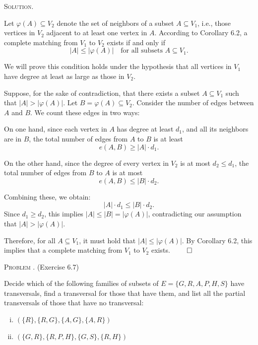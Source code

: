 \documentclass[12pt, a4paper, oneside]{ctexart}
\newcounter{problemname}
\newenvironment{problem}{\begin{framed}\stepcounter{problemname}\par\noindent\textsc{Problem \arabic{problemname}. }}{\end{framed}\par}
\newenvironment{solution}{%
	\par\noindent\textsc{Solution. }\ignorespaces
}{%
	\hfill$\qed$\par
}
\begin{document}
	\begin{solution}
		Let \( \varphi(A) \subseteq V_2 \) denote the set of neighbors of a subset \( A \subseteq V_1 \), i.e., those vertices in \( V_2 \) adjacent to at least one vertex in \( A \). According to Corollary 6.2, a complete matching from \( V_1 \) to \( V_2 \) exists if and only if
		\[
		|A| \leq |\varphi(A)|
		\quad \text{for all subsets } A \subseteq V_1.
		\]
		
		We will prove this condition holds under the hypothesis that all vertices in \( V_1 \) have degree at least as large as those in \( V_2 \).
		
		Suppose, for the sake of contradiction, that there exists a subset \( A \subseteq V_1 \) such that \( |A| > |\varphi(A)| \). Let \( B = \varphi(A) \subseteq V_2 \). Consider the number of edges between \( A \) and \( B \). We count these edges in two ways:
		
		On one hand, since each vertex in \( A \) has degree at least \( d_1 \), and all its neighbors are in \( B \), the total number of edges from \( A \) to \( B \) is at least
		\[
		e(A, B) \geq |A| \cdot d_1.
		\]
		
		On the other hand, since the degree of every vertex in \( V_2 \) is at most \( d_2 \leq d_1 \), the total number of edges from \( B \) to \( A \) is at most
		\[
		e(A, B) \leq |B| \cdot d_2.
		\]
		
		Combining these, we obtain:
		\[
		|A| \cdot d_1 \leq |B| \cdot d_2.
		\]
		Since \( d_1 \geq d_2 \), this implies \( |A| \leq |B| = |\varphi(A)| \), contradicting our assumption that \( |A| > |\varphi(A)| \).
		
		Therefore, for all \( A \subseteq V_1 \), it must hold that \( |A| \leq |\varphi(A)| \). By Corollary 6.2, this implies that a complete matching from \( V_1 \) to \( V_2 \) exists.
	\end{solution}
	
	\begin{problem}
		(Exercise 6.7)
	
	Decide which of the following families of subsets of \( E = \{G, R, A, P, H, S\} \) have transversals, 
	find a transversal for those that have them, and list all the partial transversals 
	of those that have no transversal:
	\begin{enumerate}[(i)]
		\item \( (\{R\}, \{R,G\}, \{A,G\}, \{A,R\}) \)
		\item \( (\{G,R\}, \{R,P,H\}, \{G,S\}, \{R,H\}) \)
	\end{enumerate}
		
	\end{problem}
	
\end{document}
